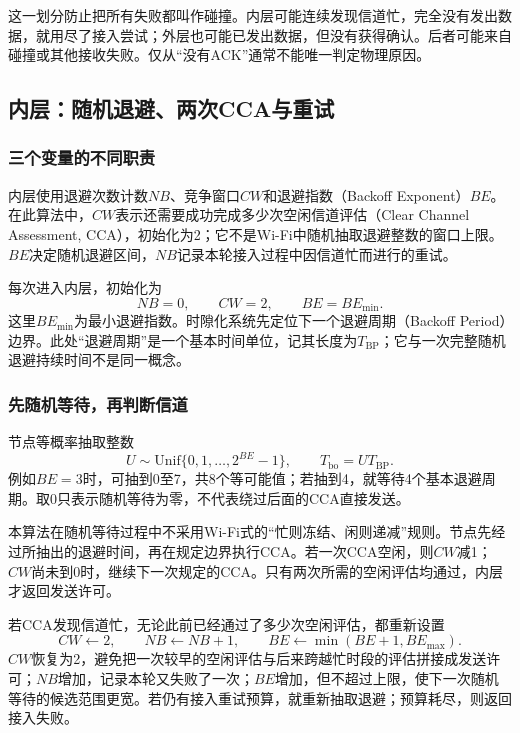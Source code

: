 这一划分防止把所有失败都叫作碰撞。内层可能连续发现信道忙，完全没有发出数据，就用尽了接入尝试；外层也可能已发出数据，但没有获得确认。后者可能来自碰撞或其他接收失败。仅从“没有ACK”通常不能唯一判定物理原因。

\subsection{内层：随机退避、两次CCA与重试}

\subsubsection{三个变量的不同职责}

内层使用退避次数计数$NB$、竞争窗口$CW$和退避指数（Backoff Exponent）$BE$。在此算法中，$CW$表示还需要成功完成多少次空闲信道评估（Clear Channel Assessment, CCA），初始化为2；它不是Wi-Fi中随机抽取退避整数的窗口上限。$BE$决定随机退避区间，$NB$记录本轮接入过程中因信道忙而进行的重试。

每次进入内层，初始化为
\begin{equation}
 NB=0,\qquad CW=2,\qquad BE=BE_{\min}.
\end{equation}
这里$BE_{\min}$为最小退避指数。时隙化系统先定位下一个退避周期（Backoff Period）边界。此处“退避周期”是一个基本时间单位，记其长度为$T_{\mathrm{BP}}$；它与一次完整随机退避持续时间不是同一概念。

\subsubsection{先随机等待，再判断信道}

节点等概率抽取整数
\begin{equation}
 U\sim\mathrm{Unif}\{0,1,\ldots,2^{BE}-1\},
 \qquad T_{\mathrm{bo}}=U T_{\mathrm{BP}}.
\end{equation}
例如$BE=3$时，可抽到0至7，共8个等可能值；若抽到4，就等待4个基本退避周期。取0只表示随机等待为零，不代表绕过后面的CCA直接发送。

本算法在随机等待过程中不采用Wi-Fi式的“忙则冻结、闲则递减”规则。节点先经过所抽出的退避时间，再在规定边界执行CCA。若一次CCA空闲，则$CW$减1；$CW$尚未到0时，继续下一次规定的CCA。只有两次所需的空闲评估均通过，内层才返回发送许可。

若CCA发现信道忙，无论此前已经通过了多少次空闲评估，都重新设置
\begin{equation}
 CW\leftarrow2,\qquad NB\leftarrow NB+1,\qquad
 BE\leftarrow\min(BE+1,BE_{\max}).
\end{equation}
$CW$恢复为2，避免把一次较早的空闲评估与后来跨越忙时段的评估拼接成发送许可；$NB$增加，记录本轮又失败了一次；$BE$增加，但不超过上限，使下一次随机等待的候选范围更宽。若仍有接入重试预算，就重新抽取退避；预算耗尽，则返回接入失败。


